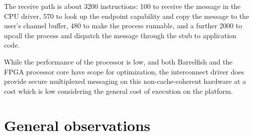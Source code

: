 \documentclass[a4paper,twoside]{report} %
\begin{document}
The receive path is about 3200 instructions: 100
to receive the message in the CPU driver, 570 to look up the endpoint
capability and copy the message to the user's channel buffer, 480 to
make the process runnable, and a further 2000 to upcall the process
and dispatch the message through the stub to application code.

While the performance of the processor is low, and both Barrelfish
and the FPGA processor core have scope for optimization,
the interconnect driver does provide secure multiplexed
messaging on this non-cache-coherent hardware at a cost which is low
considering the general cost of execution on the platform.



\chapter{General observations}



\end{document}
